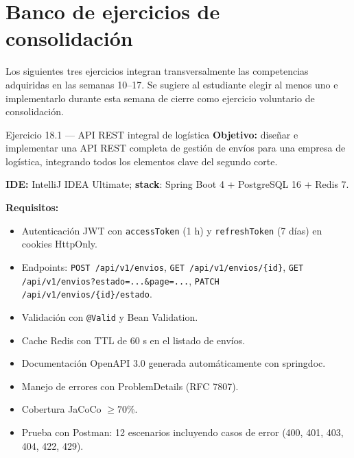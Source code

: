 \section{Banco de ejercicios de consolidación}

Los siguientes tres ejercicios integran transversalmente las
competencias adquiridas en las semanas 10--17. Se sugiere al
estudiante elegir al menos uno e implementarlo durante esta semana
de cierre como ejercicio voluntario de consolidación.

\begin{cajaejercicio}{Ejercicio 18.1 --- API REST integral de logística}
\textbf{Objetivo:} diseñar e implementar una API REST completa de
gestión de envíos para una empresa de logística, integrando todos los
elementos clave del segundo corte.

\textbf{IDE:} IntelliJ IDEA Ultimate; \textbf{stack}: Spring Boot 4
+ PostgreSQL 16 + Redis 7.

\textbf{Requisitos:}
\begin{itemize}
\item Autenticación JWT con \texttt{accessToken} (1 h) y
\texttt{refreshToken} (7 días) en cookies HttpOnly.
\item Endpoints: \texttt{POST /api/v1/envios},
\texttt{GET /api/v1/envios/\{id\}},
\texttt{GET /api/v1/envios?estado=...\&page=...},
\texttt{PATCH /api/v1/envios/\{id\}/estado}.
\item Validación con \texttt{@Valid} y Bean Validation.
\item Cache Redis con TTL de 60 s en el listado de envíos.
\item Documentación OpenAPI 3.0 generada automáticamente con
springdoc.
\item Manejo de errores con ProblemDetails (RFC 7807).
\item Cobertura JaCoCo $\geq 70\%$.
\item Prueba con Postman: 12 escenarios incluyendo casos de error
(400, 401, 403, 404, 422, 429).
\end{itemize}
\end{cajaejercicio}

